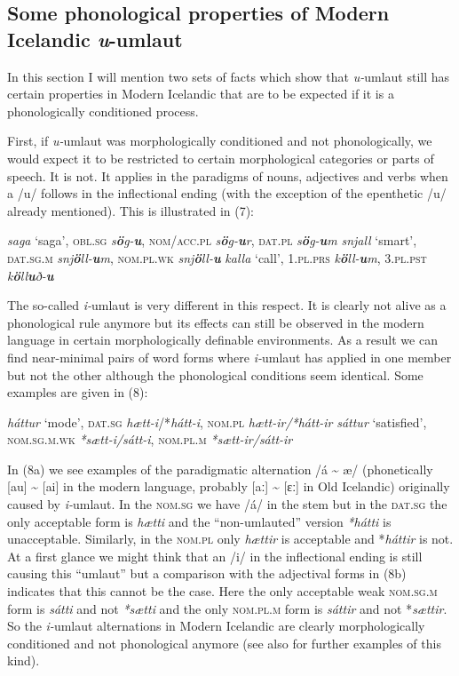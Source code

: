 \documentclass[output=paper,
modfonts
]{LSP/langsci}
\begin{document}
\subsection{Some phonological properties of Modern Icelandic \emph{u}-umlaut}

In this section I will mention two sets of facts which show that
\emph{u-}umlaut still has certain properties in Modern Icelandic that
are to be expected if it is a phonologically conditioned process.

First, if \emph{u-}umlaut was morphologically conditioned and not
phonologically, we would expect it to be restricted to certain
morphological categories or parts of speech. It is not. It applies in
the paradigms of nouns, adjectives and verbs when a /u/ follows in the
inflectional ending (with the exception of the epenthetic /u/ already
mentioned). This is illustrated in (7):

\ea
	\ea	\emph{saga} `saga', \textsc{obl.sg}
		\emph{s\textbf{ö}g-\textbf{u}}, \textsc{nom/acc.pl}
		\emph{s\textbf{ö}g-\textbf{u}r}, \textsc{dat.pl}
		\emph{s\textbf{ö}g-\textbf{u}m}
	\ex	\emph{snjall} `smart', \textsc{dat.sg.m}
		\emph{snj\textbf{ö}ll-\textbf{u}m}, \textsc{nom.pl.wk}
		\emph{snj\textbf{ö}ll-\textbf{u}}
	\ex	\emph{kalla} `call', \textsc{1.pl.prs}
		\emph{k\textbf{ö}ll-\textbf{u}m}, \textsc{3.pl.pst}
		\emph{k\textbf{ö}ll\textbf{u}ð-\textbf{u}}
	\z
\z

\noindent The so-called \emph{i-}umlaut is very different in this respect. It is
clearly not alive as a phonological rule anymore but its effects can
still be observed in the modern language in certain morphologically
definable environments. As a result we can find near-minimal pairs of
word forms where \emph{i-}umlaut has applied in one member but not the
other although the phonological conditions seem identical. Some examples
are given in (8):

\ea
	\ea 	\emph{háttur} `mode', \textsc{dat.sg}
		\emph{hætt-i}/*\emph{hátt-i}, \textsc{nom.pl} \emph{hætt-ir/*hátt-ir}
	\ex	\emph{sáttur} `satisfied', \textsc{nom.sg.m.wk}
		\emph{*sætt-i/sátt-i}, \textsc{nom.pl.m} \emph{*sætt-ir/sátt-ir}
	\z
\z

\noindent In (8a) we see examples of the paradigmatic alternation /á
\textasciitilde{} æ/ (phonetically {[}au{]} \textasciitilde{} {[}ai{]}
in the modern language, probably {[}aː{]} \textasciitilde{} {[}ɛː{]} in
Old Icelandic) originally caused by \emph{i-}umlaut. In the
\textsc{nom.sg} we have /á/ in the stem but in the \textsc{dat.sg} the
only acceptable form is \emph{hætti} and the ``non-umlauted'' version
\emph{*hátti} is unacceptable. Similarly, in the \textsc{nom.pl} only
\emph{hættir} is acceptable and *\emph{háttir} is not. At a first glance
we might think that an /i/ in the inflectional ending is still causing
this ``umlaut'' but a comparison with the adjectival forms in (8b)
indicates that this cannot be the case. Here the only acceptable weak
\textsc{nom.sg.m} form is \emph{sátti} and not \emph{*sætti} and the
only \textsc{nom.pl.m} form is \emph{sáttir} and not *\emph{sættir}. So
the \emph{i-}umlaut alternations in Modern Icelandic are clearly
morphologically conditioned and not phonological anymore (see also
\citealt[93]{thrainsson2011} for further examples of this kind).
\end{document}
